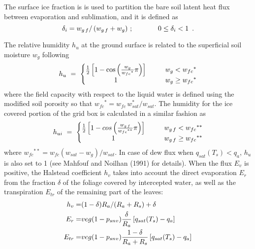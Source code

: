 The surface ice fraction is
is used to partition the bare soil latent heat flux
between evaporation and sublimation, and it is defined as
%
\begin{equation}
\label{eq:isba_soil_froz_frac}
\delta_i = w_{g\,f}/\left(w_{g\,f}+w_g\right) \,;
\hskip.5in
0 \leq \delta_i < 1   \,\,\,.
\end{equation}

The relative humidity $h_u$ at the ground surface is related to the
superficial soil moisture $w_g$ following
%
\begin{equation}
%
h_u \,\, = \,\, \Bigg\lbrace
%
\begin{matrix}
{1 \over 2} \left[ 1- {\rm cos}\left( {w_g \over {w_{fc}}^\ast} \pi \right)\right] 
&
\hskip.25in w_g < {w_{fc}}^\ast 
\\
1 
&
\hskip.25in w_g \geq {w_{fc}}^\ast
\end{matrix}
\end{equation}
%
where the field capacity with respect to the liquid water
is defined using the modified soil porosity so
that ${w_{fc}}^\ast = w_{fc}\,w_{sat}^\ast/w_{sat}$.
The humidity for the ice covered portion of the grid box
is calculated in a similar fashion as
%
\begin{equation}
%
h_{ui} \,\, = \,\, \Bigg\lbrace
%
\begin{matrix}
{1 \over 2} \left[ 1-cos \left( {w_{g\,f} \over {w_{fc}}^{\ast\ast}}
    \pi \right)\right] 
& \hskip.25in w_{g\,f} < {w_{fc}}^{\ast\ast} 
\\
1 
& \hskip.25in w_{g\,f} \geq {w_{fc}}^{\ast\ast}
\end{matrix}
\end{equation}
%
where ${w_{fc}}^{\ast\ast} = w_{fc}(w_{sat}-w_g)/w_{sat}$.
In case of dew flux when $q_{sat}(T_s) < q_a$, $h_u$ is also set
to 1 (see Mahfouf and Noilhan (1991)\nocite{Mahfouf1991a} for details).
When the flux $E_v$ is positive, the Halstead coefficient $h_v$
takes into account the direct evaporation $E_r$ from the fraction
$\delta$ of the foliage covered by intercepted water, as well as
the transpiration $E_{tr}$ of the remaining part of the leaves:
%
\begin{align}
\label{eq:isba_halstead}
h_v    =& (1-\delta) R_a / (R_a+R_s) + \delta 
\\
E_r    =& veg(1-p_{snv}) {\delta \over R_a}
        \left[ q_{sat} (T_s) - q_a \right] 
\\
E_{tr}=& veg(1-p_{snv}) {1-\delta \over R_a + R_s}
           \left[ q_{sat}(T_s) - q_a \right] 
\end{align}

